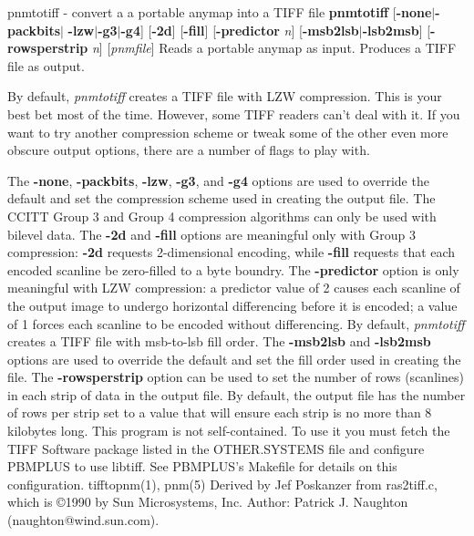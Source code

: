 pnmtotiff - convert a a portable anymap into a TIFF file
{\bf pnmtotiff}
{\rm [}{\bf -none}{\rm $|$}{\bf -packbits}{\rm $|$}
{\bf -lzw}{\rm $|$}{\bf -g3}{\rm $|$}{\bf -g4}{\rm ]}
{\rm [}{\bf -2d}{\rm ]}
{\rm [}{\bf -fill}{\rm ]}
{\rm [}{\bf -predictor}
{\it n}{\rm ]}
{\rm [}{\bf -msb2lsb}{\rm $|$}{\bf -lsb2msb}{\rm ]}
{\rm [}{\bf -rowsperstrip}
{\it n}{\rm ]}
{\rm [}{\it pnmfile}{\rm ]}
Reads a portable anymap as input.
Produces a TIFF file as output.
\par
By default,
{\it pnmtotiff}
creates a TIFF file with LZW compression.
This is your best bet most of the time.
However, some TIFF readers can't deal with it.
If you want to try another compression scheme or tweak some of the
other even more obscure output options, there are a number of
flags to play with.
\par
The
{\bf -none}{\rm ,}
{\bf -packbits}{\rm ,}
{\bf -lzw}{\rm ,}
{\bf -g3}{\rm ,}
and
{\bf -g4}
options are used to override the default and set the compression
scheme used in creating the output file.  The CCITT Group 3 and Group
4 compression algorithms can only be used with bilevel data.  The
{\bf -2d}
and
{\bf -fill}
options are meaningful only with Group 3 compression:
{\bf -2d}
requests 2-dimensional encoding, while
{\bf -fill}
requests that each encoded scanline be zero-filled to a byte boundry.
The
{\bf -predictor}
option is only meaningful with LZW compression: a predictor value of 2
causes each scanline of the output image to undergo horizontal
differencing before it is encoded; a value of 1 forces each scanline
to be encoded without differencing.
\rm
By default,
{\it pnmtotiff}
creates a TIFF file with msb-to-lsb fill order.
The
{\bf -msb2lsb}
and
{\bf -lsb2msb}
options are used to override the default and set the fill order used
in creating the file.
\rm
The
{\bf -rowsperstrip}
option can be used to set the number of rows (scanlines) in each
strip of data in the output file.  By default, the output file has
the number of rows per strip set to a value that will ensure each
strip is no more than 8 kilobytes long.
This program is not self-contained.  To use it you must fetch the
TIFF Software package listed in the OTHER.SYSTEMS file and configure
PBMPLUS to use libtiff.  See PBMPLUS's Makefile for details on this
configuration.
tifftopnm(1), pnm(5)
Derived by Jef Poskanzer from ras2tiff.c, which is
\copyright 1990 by Sun Microsystems, Inc.\hfil\break
Author: Patrick J. Naughton (naughton@wind.sun.com).
